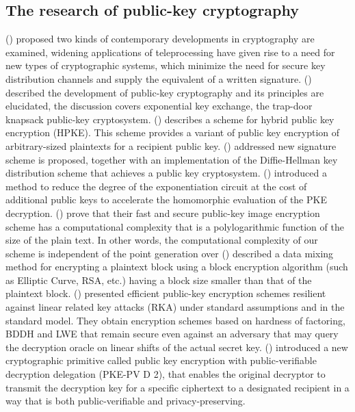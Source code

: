 \documentclass[graybox]{svmult}
\begin{document}
\subsection{The research of public-key cryptography}
\citeauthor{diffie1976} (\citeyear{diffie1976}) proposed two kinds of contemporary developments in cryptography are examined, widening applications of teleprocessing have given rise to a need for new types of cryptographic systems, which minimize the need for secure key distribution channels and supply the equivalent of a written signature.
\citeauthor{diffie1988} (\citeyear{diffie1988}) described the development of public-key cryptography and its  principles are elucidated, the discussion covers exponential key exchange, the trap-door knapsack public-key cryptosystem.
\citeauthor{barnes2022} (\citeyear{barnes2022}) describes a scheme for  hybrid public key encryption (HPKE). This scheme provides a variant of public key encryption of arbitrary-sized plaintexts for a recipient public key.
\citeauthor{elgamal1985} (\citeyear{elgamal1985}) addressed new signature scheme is proposed, together with an  implementation of the Diffie-Hellman key distribution scheme that achieves a public key cryptosystem.
\citeauthor{cheon2015} (\citeyear{cheon2015}) introduced a method to reduce the degree of the exponentiation circuit at the cost of additional public keys to accelerate the homomorphic evaluation of the PKE decryption.
\citeauthor{azam2021} (\citeyear{azam2021}) prove that their fast and secure public-key image encryption scheme has a computational complexity that is a polylogarithmic function of the size of the plain text.
In other words, the computational complexity of our scheme is independent of the point generation over
\citeauthor{zhang2021} (\citeyear{zhang2021}) described a data mixing method for encrypting a plaintext block using a block encryption algorithm (such as Elliptic Curve, RSA, etc.) having a block size smaller than that of the plaintext block.
\citeauthor{wee2012} (\citeyear{wee2012}) presented efficient public-key encryption schemes resilient against linear related key attacks (RKA) under standard assumptions and in the standard model. They obtain encryption schemes based on hardness of factoring, BDDH and LWE that remain secure even against an adversary that may query the decryption oracle on linear shifts of the actual secret key.
\citeauthor{hou2023} (\citeyear{hou2023}) introduced a new cryptographic primitive called public key encryption with public-verifiable decryption delegation (PKE-PV D 2), that enables the original decryptor to transmit the decryption key for a specific ciphertext to a designated recipient in a way that is both public-verifiable and privacy-preserving.
\end{document}

